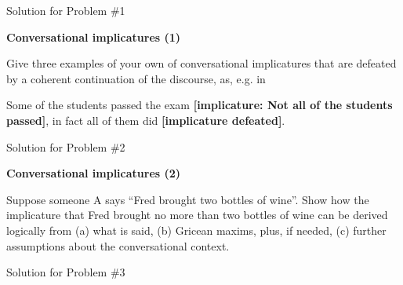 \documentclass[11pt]{article}
\begin{document}
\begin{solution}
Solution for Problem \#1
\end{solution}

\vspace*{0.5cm} %

\begin{problem}{2}
\textbf{Conversational implicatures (1)}

Give three examples of your own of conversational implicatures that are defeated by a coherent continuation of the discourse, as, e.g. in 

Some of the students passed the exam \textbf{[implicature: Not all of the students passed]}, in fact all of them did \textbf{[implicature defeated]}.


\end{problem}

\begin{solution}
Solution for Problem \#2
\end{solution}

\vspace*{0.5cm}

\begin{problem}{3}
\textbf{ Conversational implicatures (2)}

Suppose someone A says ``Fred brought two bottles of wine''. Show how the
implicature that Fred brought no more than two bottles of wine can be derived
logically from (a) what is said, (b) Gricean maxims, plus, if needed, (c) further
assumptions about the conversational context.
\end{problem}

\begin{solution}
Solution for Problem \#3
\end{solution}

\vspace*{0.5cm}
\end{document}
